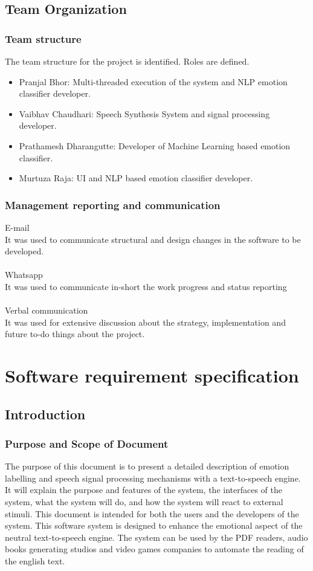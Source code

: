 \documentclass[oneside,a4paper,12pt]{book}
\begin{document}
 
\section{Team Organization}  
\subsection{Team structure}
The team structure for the project is identified. Roles are defined.
\begin{itemize}
	\item[] Pranjal Bhor: Multi-threaded execution of the system and NLP emotion classifier developer.
	\item[] Vaibhav Chaudhari: Speech Synthesis System and signal processing developer.
	\item[] Prathamesh Dharangutte: Developer of Machine Learning based emotion classifier.
	\item[] Murtuza Raja: UI and NLP based emotion classifier developer.
\end{itemize}

\subsection{Management reporting and communication}
 E-mail\\
		It was used to communicate structural and design changes in the software to be developed. \\	\\	
 Whatsapp\\
		It was used to communicate in-short the work progress and status reporting\\\\
Verbal communication\\
		It was used for extensive discussion about the strategy, implementation and future to-do things about the project.

 
\chapter{Software requirement specification  }

\section{Introduction}
\subsection{Purpose and Scope of Document}
The purpose of this document is to present a detailed description of emotion labelling and speech signal processing mechanisms with a text-to-speech engine. It will explain the purpose and features of the system, the interfaces of the system, what the system will
do, and how the system will react to external stimuli. This document is intended for
both the users and the developers of the system.
This software system is designed to enhance the emotional aspect of the neutral text-to-speech engine. The system can be used by the PDF readers, audio books generating studios and video games companies to automate the reading of the english text. 
\end{document}
